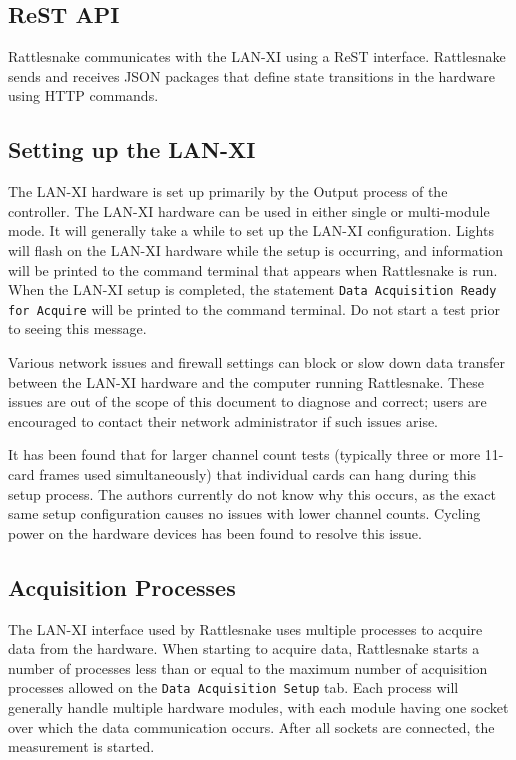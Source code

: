 \documentclass[pdf,12pt,report]{SANDreport}
\newcommand{\inlineCode}{\lstinline[basicstyle=\bfseries\ttfamily]}
\begin{document}
    \subsection{ReST API}
    Rattlesnake communicates with the LAN-XI using a \ac{ReST} interface.  Rattlesnake sends and receives \ac{JSON} packages that define state transitions in the hardware using HTTP commands.
    
    \subsection{Setting up the LAN-XI}
    The LAN-XI hardware is set up primarily by the Output process of the controller.  The LAN-XI hardware can be used in either single or multi-module mode.  It will generally take a while to set up the LAN-XI configuration.  Lights will flash on the LAN-XI hardware while the setup is occurring, and information will be printed to the command terminal that appears when Rattlesnake is run.  When the LAN-XI setup is completed, the statement \inlineCode{Data Acquisition Ready for Acquire} will be printed to the command terminal.  Do not start a test prior to seeing this message.
    
    Various network issues and firewall settings can block or slow down data transfer between the LAN-XI hardware and the computer running Rattlesnake.  These issues are out of the scope of this document to diagnose and correct; users are encouraged to contact their network administrator if such issues arise.
    
    It has been found that for larger channel count tests (typically three or more 11-card frames used simultaneously) that individual cards can hang during this setup process.  The authors currently do not know why this occurs, as the exact same setup configuration causes no issues with lower channel counts.  Cycling power on the hardware devices has been found to resolve this issue.
    
    \subsection{Acquisition Processes}
    The LAN-XI interface used by Rattlesnake uses multiple processes to acquire data from the hardware.  When starting to acquire data, Rattlesnake starts a number of processes less than or equal to the maximum number of acquisition processes allowed on the \inlineCode{Data Acquisition Setup} tab.  Each process will generally handle multiple hardware modules, with each module having one socket over which the data communication occurs.  After all sockets are connected, the measurement is started.
    
\end{document}
